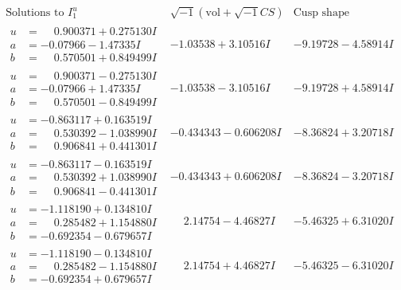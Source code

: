 \documentclass[1p]{elsarticle_modified}
\theoremstyle{definition}
\newcommand{\I}{\sqrt{-1}}
\begin{document}
$$\begin{array}{c|c|c}  
\text{Solutions to }I^u_{1}& \I (\text{vol} + \sqrt{-1}CS) & \text{Cusp shape}\\
 \hline 
\begin{aligned}
u &= \phantom{-}0.900371 + 0.275130 I \\
a &= -0.07966 - 1.47335 I \\
b &= \phantom{-}0.570501 + 0.849499 I\end{aligned}
 & -1.03538 + 3.10516 I & -9.19728 - 4.58914 I \\ \hline\begin{aligned}
u &= \phantom{-}0.900371 - 0.275130 I \\
a &= -0.07966 + 1.47335 I \\
b &= \phantom{-}0.570501 - 0.849499 I\end{aligned}
 & -1.03538 - 3.10516 I & -9.19728 + 4.58914 I \\ \hline\begin{aligned}
u &= -0.863117 + 0.163519 I \\
a &= \phantom{-}0.530392 - 1.038990 I \\
b &= \phantom{-}0.906841 + 0.441301 I\end{aligned}
 & -0.434343 - 0.606208 I & -8.36824 + 3.20718 I \\ \hline\begin{aligned}
u &= -0.863117 - 0.163519 I \\
a &= \phantom{-}0.530392 + 1.038990 I \\
b &= \phantom{-}0.906841 - 0.441301 I\end{aligned}
 & -0.434343 + 0.606208 I & -8.36824 - 3.20718 I \\ \hline\begin{aligned}
u &= -1.118190 + 0.134810 I \\
a &= \phantom{-}0.285482 + 1.154880 I \\
b &= -0.692354 - 0.679657 I\end{aligned}
 & \phantom{-}2.14754 - 4.46827 I & -5.46325 + 6.31020 I \\ \hline\begin{aligned}
u &= -1.118190 - 0.134810 I \\
a &= \phantom{-}0.285482 - 1.154880 I \\
b &= -0.692354 + 0.679657 I\end{aligned}
 & \phantom{-}2.14754 + 4.46827 I & -5.46325 - 6.31020 I \\ \hline\begin{aligned}

\end{aligned}
\end{array}$$
\end{document}
